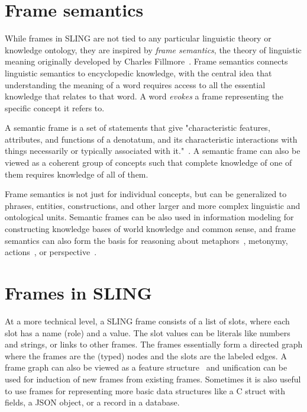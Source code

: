 \documentclass[11pt,a4paper]{article}
\begin{document}
\section{Frame semantics}
\label{sec:framesem}

While frames in SLING are not tied to any particular linguistic theory or
knowledge ontology, they are inspired by \emph{frame semantics}, the
theory of linguistic meaning originally developed by Charles Fillmore~\cite{fillmore1982}.
Frame semantics connects linguistic semantics to encyclopedic knowledge, with the
central idea that understanding the meaning of a word requires access to all
the essential knowledge that relates to that word. A word \emph{evokes} a frame
representing the specific concept it refers to.

A semantic frame is a set of statements that give "characteristic
features, attributes, and functions of a denotatum, and its characteristic
interactions with things necessarily or typically associated with it."~\cite{alan2001}.
A semantic frame can also be viewed as a coherent group of concepts
such that complete knowledge of one of them requires knowledge of all of them.

Frame semantics is not just for individual concepts, but can be generalized
to phrases, entities, constructions, and other larger and more complex linguistic
and ontological units. Semantic frames can be also used in information modeling
for constructing knowledge bases of world knowledge and common sense, and frame
semantics can also form the basis for reasoning about
metaphors~\cite{narayanan1999},
metonymy,
actions~\cite{narayanan1999reasoning},
or perspective~\cite{chang2002}.

\section{Frames in SLING}
\label{sec:slingframes}

At a more technical level, a SLING frame consists of a list of slots, where each
slot has a name (role) and a value. The slot values can be literals like numbers
and strings, or links to other frames. The frames essentially form a directed graph where
the frames are the (typed) nodes and the slots are the labeled edges. A frame
graph can also be viewed as a feature structure~\cite{carpenter2005} and
unification can be used for induction of new frames from existing frames.
Sometimes it is also useful to use frames for representing more basic data
structures like a C struct with fields, a JSON object, or a record in a
database.
\end{document}
